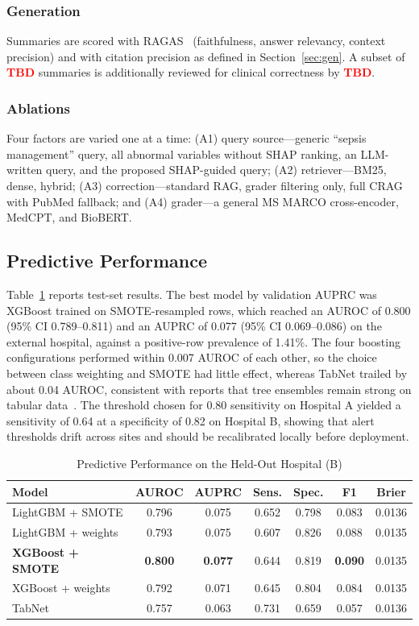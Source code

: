 \documentclass[conference]{IEEEtran}
\newcommand{\tbd}{\textcolor{red}{\textbf{TBD}}}
\begin{document}
\subsubsection{Generation}
Summaries are scored with RAGAS~\cite{es2024ragas} (faithfulness, answer
relevancy, context precision) and with citation precision as defined in
Section~\ref{sec:gen}. A subset of \tbd{} summaries is additionally reviewed for
clinical correctness by \tbd.

\subsubsection{Ablations}
Four factors are varied one at a time: (A1) query source---generic
``sepsis management'' query, all abnormal variables without SHAP ranking,
an LLM-written query, and the proposed SHAP-guided query; (A2)
retriever---BM25, dense, hybrid; (A3) correction---standard RAG, grader
filtering only, full CRAG with PubMed fallback; and (A4) grader---a general
MS MARCO cross-encoder, MedCPT, and BioBERT.

\subsection{Predictive Performance}
Table~\ref{tab:pred} reports test-set results. The best model by validation
AUPRC was XGBoost trained on SMOTE-resampled rows, which reached an AUROC of
0.800 (95\% CI 0.789--0.811) and an AUPRC of 0.077 (95\% CI 0.069--0.086) on
the external hospital, against a positive-row prevalence of 1.41\%. The four
boosting configurations performed within 0.007 AUROC of each other, so the
choice between class weighting and SMOTE had little effect, whereas TabNet
trailed by about 0.04 AUROC, consistent with reports that tree ensembles
remain strong on tabular data~\cite{shwartz2022tabular}. The threshold
chosen for 0.80 sensitivity on Hospital A yielded a sensitivity of 0.64 at a
specificity of 0.82 on Hospital B, showing that alert thresholds drift
across sites and should be recalibrated locally before deployment.

\begin{table}[!t]
\caption{Predictive Performance on the Held-Out Hospital (B)}
\label{tab:pred}
\centering
\footnotesize
\setlength{\tabcolsep}{3.5pt}
\begin{tabular}{@{}lcccccc@{}}
\toprule
Model & AUROC & AUPRC & Sens. & Spec. & F1 & Brier \\
\midrule
LightGBM + SMOTE & 0.796 & 0.075 & 0.652 & 0.798 & 0.083 & 0.0136 \\
LightGBM + weights & 0.793 & 0.075 & 0.607 & 0.826 & 0.088 & 0.0135 \\
\textbf{XGBoost + SMOTE} & \textbf{0.800} & \textbf{0.077} & 0.644 & 0.819 & \textbf{0.090} & 0.0135 \\
XGBoost + weights & 0.792 & 0.071 & 0.645 & 0.804 & 0.084 & 0.0135 \\
TabNet & 0.757 & 0.063 & 0.731 & 0.659 & 0.057 & 0.0136 \\
\bottomrule
\end{tabular}
\end{table}
\end{document}
